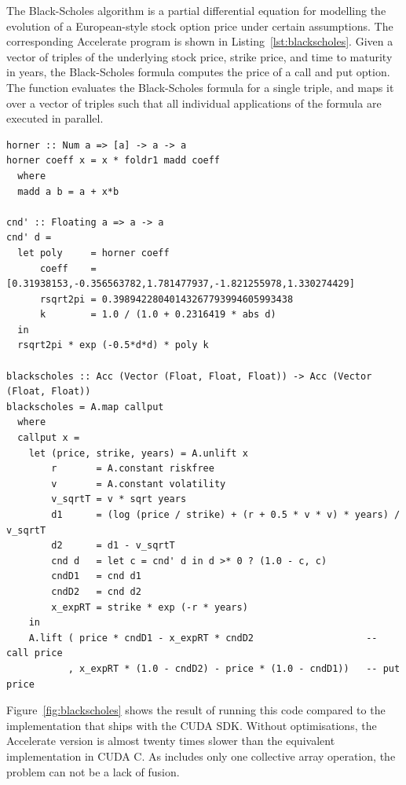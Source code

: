 The Black-Scholes algorithm is a partial differential equation for modelling the
evolution of a European-style stock option price under certain assumptions. The
corresponding Accelerate program is shown in Listing~\ref{lst:blackscholes}.
Given a vector of triples of the underlying stock price, strike price, and time
to maturity in years, the Black-Scholes formula computes the price of a call and
put option. The function  evaluates the Black-Scholes formula for
a single triple, and  maps it over a vector of triples such
that all individual applications of the formula are executed in parallel.
%
\begin{lstlisting}[style=haskell
    ,float=htbp
    ,label=lst:blackscholes
    ,caption={Black-Scholes option pricing in Accelerate}]
horner :: Num a => [a] -> a -> a
horner coeff x = x * foldr1 madd coeff
  where
  madd a b = a + x*b

cnd' :: Floating a => a -> a
cnd' d =
  let poly     = horner coeff
      coeff    = [0.31938153,-0.356563782,1.781477937,-1.821255978,1.330274429]
      rsqrt2pi = 0.39894228040143267793994605993438
      k        = 1.0 / (1.0 + 0.2316419 * abs d)
  in
  rsqrt2pi * exp (-0.5*d*d) * poly k

blackscholes :: Acc (Vector (Float, Float, Float)) -> Acc (Vector (Float, Float))
blackscholes = A.map callput
  where
  callput x =
    let (price, strike, years) = A.unlift x
        r       = A.constant riskfree
        v       = A.constant volatility
        v_sqrtT = v * sqrt years
        d1      = (log (price / strike) + (r + 0.5 * v * v) * years) / v_sqrtT
        d2      = d1 - v_sqrtT
        cnd d   = let c = cnd' d in d >* 0 ? (1.0 - c, c)
        cndD1   = cnd d1
        cndD2   = cnd d2
        x_expRT = strike * exp (-r * years)
    in
    A.lift ( price * cndD1 - x_expRT * cndD2                    -- call price
           , x_expRT * (1.0 - cndD2) - price * (1.0 - cndD1))   -- put price
\end{lstlisting}

Figure~\ref{fig:blackscholes} shows the result of running this code compared to
the implementation that ships with the CUDA SDK. Without optimisations, the
Accelerate version is almost twenty times slower than the equivalent
implementation in CUDA C. As  includes only one collective
array operation, the problem can not be a lack of fusion.

